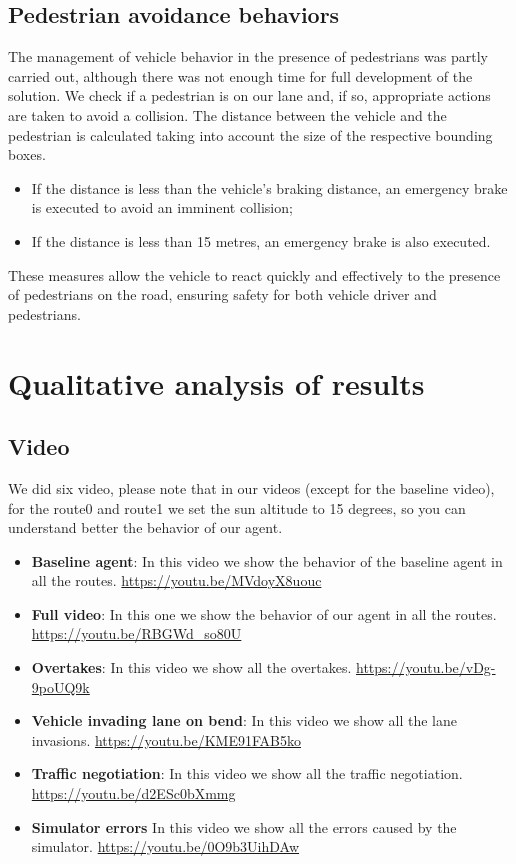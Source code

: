 \documentclass{article}
\begin{document}
\subsection{Pedestrian avoidance behaviors}
The management of vehicle behavior in the presence of pedestrians was partly carried out,
although there was not enough time for full development of the solution.
We check if a pedestrian is on our lane and, if so, appropriate actions are taken to avoid a collision.
The distance between the vehicle and the pedestrian is calculated taking into account the size of the
respective bounding boxes.
\begin{itemize}
    \item If the distance is less than the vehicle's braking distance, an emergency brake is executed to avoid an imminent collision;
    \item If the distance is less than 15 metres, an emergency brake is also executed.
\end{itemize}
These measures allow the vehicle to react quickly and effectively to the presence of pedestrians on the road,
ensuring safety for both vehicle driver and pedestrians.

\section{Qualitative analysis of results}
\subsection{Video}
We did six video, please note that in our videos (except for the baseline video), for the route0 and route1 we set the sun altitude to 15 degrees,
so you can understand better the behavior of our agent.

\begin{itemize}
    \item \textbf{Baseline agent}: In this video we show the behavior of the baseline agent in all the routes. \url{https://youtu.be/MVdoyX8uouc}
    \item \textbf{Full video}: In this one we show the behavior of our agent in all the routes. \url{https://youtu.be/RBGWd_so80U}
    \item \textbf{Overtakes}: In this video we show all the overtakes. \url{https://youtu.be/vDg-9poUQ9k}
    \item \textbf{Vehicle invading lane on bend}: In this video we show all the lane invasions. \url{https://youtu.be/KME91FAB5ko}
    \item \textbf{Traffic negotiation}: In this video we show all the traffic negotiation. \url{https://youtu.be/d2ESc0bXmmg}
    \item \textbf{Simulator errors} In this video we show all the errors caused by the simulator. \url{https://youtu.be/0O9b3UihDAw}
\end{itemize}
\end{document}

